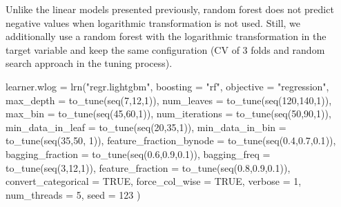 \documentclass[11pt,a4paper]{article}
\newenvironment{Shaded}{\begin{snugshade}}{\end{snugshade}}
\newcommand{\AttributeTok}[1]{\textcolor[rgb]{0.77,0.63,0.00}{#1}}
\newcommand{\ConstantTok}[1]{\textcolor[rgb]{0.00,0.00,0.00}{#1}}
\newcommand{\DecValTok}[1]{\textcolor[rgb]{0.00,0.00,0.81}{#1}}
\newcommand{\FloatTok}[1]{\textcolor[rgb]{0.00,0.00,0.81}{#1}}
\newcommand{\FunctionTok}[1]{\textcolor[rgb]{0.00,0.00,0.00}{#1}}
\newcommand{\NormalTok}[1]{#1}
\newcommand{\OtherTok}[1]{\textcolor[rgb]{0.56,0.35,0.01}{#1}}
\newcommand{\StringTok}[1]{\textcolor[rgb]{0.31,0.60,0.02}{#1}}
\begin{document}
Unlike the linear models presented previously, random forest does not
predict negative values when logarithmic transformation is not used.
Still, we additionally use a random forest with the logarithmic
transformation in the target variable and keep the same configuration
(CV of 3 folds and random search approach in the tuning process).

\begin{Shaded}
\begin{Highlighting}[]
\NormalTok{learner.wlog }\OtherTok{=} \FunctionTok{lrn}\NormalTok{(}\StringTok{"regr.lightgbm"}\NormalTok{,}
              \AttributeTok{boosting =} \StringTok{"rf"}\NormalTok{,}
              \AttributeTok{objective =} \StringTok{"regression"}\NormalTok{,}
              \AttributeTok{max\_depth =} \FunctionTok{to\_tune}\NormalTok{(}\FunctionTok{seq}\NormalTok{(}\DecValTok{7}\NormalTok{,}\DecValTok{12}\NormalTok{,}\DecValTok{1}\NormalTok{)),}
              \AttributeTok{num\_leaves =} \FunctionTok{to\_tune}\NormalTok{(}\FunctionTok{seq}\NormalTok{(}\DecValTok{120}\NormalTok{,}\DecValTok{140}\NormalTok{,}\DecValTok{1}\NormalTok{)),}
              \AttributeTok{max\_bin =} \FunctionTok{to\_tune}\NormalTok{(}\FunctionTok{seq}\NormalTok{(}\DecValTok{45}\NormalTok{,}\DecValTok{60}\NormalTok{,}\DecValTok{1}\NormalTok{)),}
              \AttributeTok{num\_iterations  =} \FunctionTok{to\_tune}\NormalTok{(}\FunctionTok{seq}\NormalTok{(}\DecValTok{50}\NormalTok{,}\DecValTok{90}\NormalTok{,}\DecValTok{1}\NormalTok{)),}
              \AttributeTok{min\_data\_in\_leaf =} \FunctionTok{to\_tune}\NormalTok{(}\FunctionTok{seq}\NormalTok{(}\DecValTok{20}\NormalTok{,}\DecValTok{35}\NormalTok{,}\DecValTok{1}\NormalTok{)), }
              \AttributeTok{min\_data\_in\_bin =} \FunctionTok{to\_tune}\NormalTok{(}\FunctionTok{seq}\NormalTok{(}\DecValTok{35}\NormalTok{,}\DecValTok{50}\NormalTok{, }\DecValTok{1}\NormalTok{)),}
              \AttributeTok{feature\_fraction\_bynode =} \FunctionTok{to\_tune}\NormalTok{(}\FunctionTok{seq}\NormalTok{(}\FloatTok{0.4}\NormalTok{,}\FloatTok{0.7}\NormalTok{,}\FloatTok{0.1}\NormalTok{)),}
              \AttributeTok{bagging\_fraction =} \FunctionTok{to\_tune}\NormalTok{(}\FunctionTok{seq}\NormalTok{(}\FloatTok{0.6}\NormalTok{,}\FloatTok{0.9}\NormalTok{,}\FloatTok{0.1}\NormalTok{)),}
              \AttributeTok{bagging\_freq =} \FunctionTok{to\_tune}\NormalTok{(}\FunctionTok{seq}\NormalTok{(}\DecValTok{3}\NormalTok{,}\DecValTok{12}\NormalTok{,}\DecValTok{1}\NormalTok{)),}
              \AttributeTok{feature\_fraction =} \FunctionTok{to\_tune}\NormalTok{(}\FunctionTok{seq}\NormalTok{(}\FloatTok{0.8}\NormalTok{,}\FloatTok{0.9}\NormalTok{,}\FloatTok{0.1}\NormalTok{)),}
              \AttributeTok{convert\_categorical =} \ConstantTok{TRUE}\NormalTok{,}
              \AttributeTok{force\_col\_wise =} \ConstantTok{TRUE}\NormalTok{,}
              \AttributeTok{verbose =} \DecValTok{1}\NormalTok{,}
              \AttributeTok{num\_threads =} \DecValTok{5}\NormalTok{,}
              \AttributeTok{seed =} \DecValTok{123}
\NormalTok{)}
\end{Highlighting}
\end{Shaded}
\end{document}
